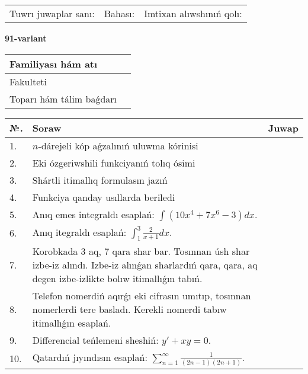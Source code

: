 \documentclass{article}
\begin{document}
\vspace{1cm}

\begin{tabular}{ c c c }
Tuwrı juwaplar sanı: \underline{\hspace{2cm}} & Bahası: \underline{\hspace{2cm}} & Imtixan alıwshınıń qolı: \underline{\hspace{2cm}} \\
\end{tabular}

\newpage

\begin{center}\textbf{91-variant}\end{center}

\bgroup
\def\arraystretch{1.5}
\begin{tabular}{ |m{6cm}|m{10cm}| }
  \hline
  Familiyası hám atı & \\
  \hline
  Fakulteti &\\
  \hline
  Toparı hám tálim baǵdarı & \\
  \hline
\end{tabular}
\egroup

\vspace{0.5cm}

\bgroup
\def\arraystretch{2}
\begin{tabular}{ |l|m{8cm}|m{7cm}| }
  \hline
  №. & Soraw & Juwap \\
  \hline
  1. & $n$-dárejeli kóp aǵzalınıń uluwma kórinisi &  \\
  \hline
  2. & Eki ózgeriwshili funkciyanıń tolıq ósimi &  \\
  \hline
  3. & Shártli itimallıq formulasın jazıń &  \\
  \hline
  4. & Funkciya qanday usıllarda beriledi &  \\
  \hline
  5. & Anıq emes integraldı esaplań: $\displaystyle\int \left( 10x^{4} + 7x^{6} - 3 \right)dx$. &  \\
  \hline
  6. & Anıq itegraldı esaplań: $\displaystyle\int_{1}^{3}{\frac{2}{x + 1}dx}$. &  \\
  \hline
  7. & Korobkada 3 aq, 7 qara shar bar. Tosınnan úsh shar izbe-iz alındı. Izbe-iz alınǵan sharlardıń qara, qara, aq degen izbe-izlikte bolıw itimallıǵın tabıń. &  \\
  \hline
  8. & Telefon nomerdiń aqırǵı eki cifrasın umıtıp, tosınnan nomerlerdi tere basladı. Kerekli nomerdi tabıw itimallıǵın esaplań. &  \\
  \hline
  9. & Differencial teńlemeni sheshiń: $y' + xy = 0$. &  \\
  \hline
  10. & Qatardıń jıyındısın esaplań: $\displaystyle\sum_{n = 1}^{\infty}\frac{1}{(2n - 1)(2n + 1)}$. &  \\
  \hline
\end{tabular}
\egroup
\end{document}
